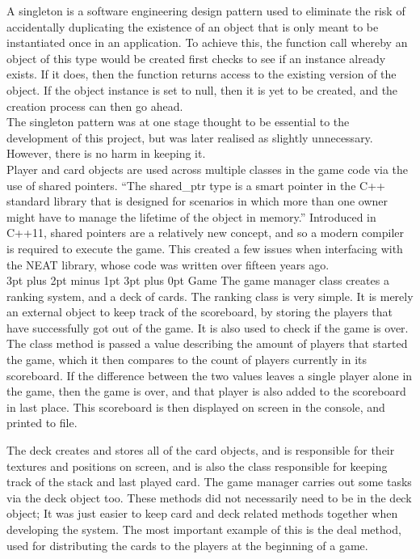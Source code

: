 \documentclass[12pt,a4paper]{article}
\makeatletter
\renewcommand\subsection{\@startsection {subsection}{1}{2mm} %
                               {3pt plus 2pt minus 1pt} %
                               {3pt plus 0pt} %
                               {\normalfont\bfseries}}
\makeatother
\begin{document}
A singleton is a software engineering design pattern used to eliminate the risk of accidentally duplicating the existence of an object that is only meant to be instantiated once in an application\citep{31}. To achieve this, the function call whereby an object of this type would be created first checks to see if an instance already exists. If it does, then the function returns access to the existing version of the object. If the object instance is set to null, then it is yet to be created, and the creation process can then go ahead.\\

The singleton pattern was at one stage thought to be essential to the development of this project, but was later realised as slightly unnecessary. However, there is no harm in keeping it.\\

Player and card objects are used across multiple classes in the game code via the use of shared pointers. \enquote{The shared\_ptr type is a smart pointer in the C++ standard library that is designed for scenarios in which more than one owner might have to manage the lifetime of the object in memory\citep{sharedptr}.} Introduced in C++11, shared pointers are a relatively new concept, and so a modern compiler is required to execute the game. This created a few issues when interfacing with the NEAT library, whose code was written over fifteen years ago. \\

\subsection{Game}
The game manager class creates a ranking system, and a deck of cards. The ranking class is very simple. It is merely an external object to keep track of the scoreboard, by storing the players that have successfully got out of the game. It is also used to check if the game is over. The class method is passed a value describing the amount of players that started the game, which it then compares to the count of players currently in its scoreboard. If the difference between the two values leaves a single player alone in the game, then the game is over, and that player is also added to the scoreboard in last place. This scoreboard is then displayed on screen in the console, and printed to file.

The deck creates and stores all of the card objects, and is responsible for their textures and positions on screen, and is also the class responsible for keeping track of the stack and last played card. The game manager carries out some tasks via the deck object too. These methods did not necessarily need to be in the deck object; It was just easier to keep card and deck related methods together when developing the system. The most important example of this is the deal method, used for distributing the cards to the players at the beginning of a game.\\
\end{document}
